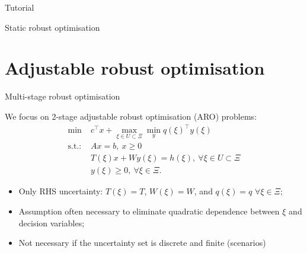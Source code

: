 \begin{frame}{Tutorial}

\centering
\bf
\large

Static robust optimisation
	
\end{frame}


\section{Adjustable robust optimisation}


\begin{frame}{Multi-stage robust optimisation}

	We focus on 2-stage adjustable robust optimisation (ARO) problems:
	\begin{equation} \tag{ARO}
	\begin{aligned}
		\min~  & c^\top x + \max_{\xi \in U \subset \Xi} \min_y q(\xi)^\top y(\xi) \\
		\text{s.t.:~}  & Ax = b, \ x \ge 0 \\
			   & T(\xi)x + Wy(\xi) = h(\xi), \ \forall \xi \in U \subset \Xi \\
			   & y(\xi) \ge 0, \ \forall \xi \in \Xi.
	\end{aligned}
	\end{equation}
	\pause
	\vspace{-6pt}
	\begin{itemize}
		\item Only \alert{RHS} uncertainty: $T(\xi) = T$, $W(\xi) = W$, and $q(\xi) = q$ $\forall \xi \in \Xi$;
		\item Assumption often necessary to eliminate \alert{quadratic} dependence between $\xi$ and decision variables;
		\item Not necessary if the uncertainty set is \alert{discrete} and \alert{finite} (scenarios)
	\end{itemize}



	
\end{frame}


